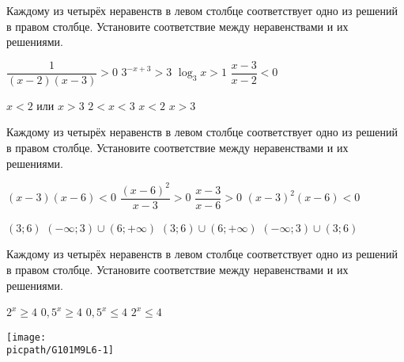 \begin{class}[number=6]
\begin{listofex}
		\item Каждому из четырёх неравенств в левом столбце соответствует одно из решений в правом столбце. Установите соответствие между неравенствами и их решениями. \\
		\begin{minipage}[t]{0.45\linewidth}
			\begin{tasks}
				\task \( \dfrac{ 1 }{ (x-2)(x-3) } > 0 \)
				\task \( 3^{-x+3} > 3 \)
				\task \( \log_3 x > 1 \)
				\task \( \dfrac{ x-3 }{ x-2 } < 0 \)
			\end{tasks}
		\end{minipage}
		\hspace{0.02\linewidth}
		\begin{minipage}[t]{0.45\linewidth}
			\begin{tasks}
				\task \( x<2 \) или \(x>3\)
				\task \( 2<x<3 \)
				\task \( x<2 \)
				\task \( x>3 \)
			\end{tasks}
		\end{minipage}
		
		\item Каждому из четырёх неравенств в левом столбце соответствует одно из решений в правом столбце. Установите соответствие между неравенствами и их решениями. \\
		\begin{minipage}[t]{0.45\linewidth}
			\begin{tasks}
				\task \( (x-3)(x-6) < 0 \)
				\task \( \dfrac{ (x-6)^2 }{ x-3 } >0 \)
				\task \( \dfrac{ x-3 }{ x-6 } > 0 \)
				\task \( (x-3)^2(x-6) < 0 \)
			\end{tasks}
		\end{minipage}
		\hspace{0.02\linewidth}
		\begin{minipage}[t]{0.45\linewidth}
			\begin{tasks}
				\task \( (3;6) \)
				\task \( (-\infty; 3) \cup (6; + \infty) \)
				\task \( (3;6) \cup (6; +\infty) \)
				\task \( (- \infty; 3) \cup (3;6) \)
			\end{tasks}
		\end{minipage}
		
		\item Каждому из четырёх неравенств в левом столбце соответствует одно из решений в правом столбце. Установите соответствие между неравенствами и их решениями. \\
		\begin{minipage}[t]{\bodywidth}
			\begin{tasks}
				\task \( 2^x \ge 4 \)
				\task \( 0,5^x \ge 4 \)
				\task \( 0,5^x \le 4 \)
				\task \( 2^x \le 4 \)
			\end{tasks}
		\end{minipage}
		\hspace{0.02\linewidth}
		\begin{minipage}[t]{\picwidth}
			\texttt{[image: \\picpath/G101M9L6-1]}
		\end{minipage}
		

\end{listofex}
\end{class}
